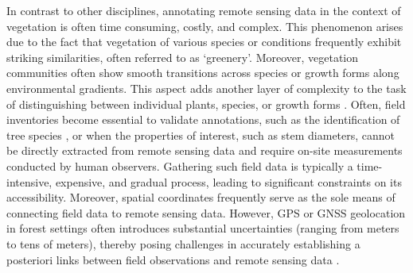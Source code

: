 \documentclass{CUP-JNL-DTM}%
\theoremstyle{definition}
\numberwithin{equation}{section}
\begin{document}
In contrast to other disciplines, annotating remote sensing data in the context of vegetation is often time consuming, costly, and complex. 
This phenomenon arises due to the fact that vegetation of various species or conditions frequently exhibit striking similarities, often referred to as `greenery'.
Moreover, vegetation communities often show smooth transitions across species or growth forms along environmental gradients. %
This aspect adds another layer of complexity to the task of distinguishing between individual plants, species, or growth forms \cite{kattenborn_review_2021}.
Often, field inventories become essential to validate annotations, such as the identification of tree species \cite{cloutier_influence_2023, kattenborn_convolutional_2020}, or when the properties of interest, such as stem diameters, cannot be directly extracted from remote sensing data and require on-site measurements conducted by human observers.
Gathering such field data is typically a time-intensive, expensive, and gradual process, leading to significant constraints on its accessibility.
Moreover, spatial coordinates frequently serve as the sole means of connecting field data to remote sensing data. However, GPS or GNSS geolocation in forest settings often introduces substantial uncertainties (ranging from meters to tens of meters), thereby posing challenges in accurately establishing a posteriori links between field observations and remote sensing data \cite{kattenborn_review_2021}.
\end{document}
